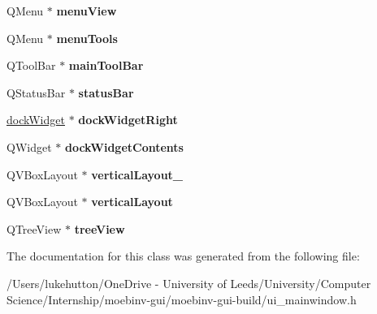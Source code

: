 \begin{DoxyCompactItemize}
Q\+Menu $\ast$ {\bfseries menu\+View}
\item 
\mbox{\label{class_ui___main_window_a552c7b6d729252c2768c9a077679fef7}} 
Q\+Menu $\ast$ {\bfseries menu\+Tools}
\item 
\mbox{\label{class_ui___main_window_a5172877001c8c7b4e0f6de50421867d1}} 
Q\+Tool\+Bar $\ast$ {\bfseries main\+Tool\+Bar}
\item 
\mbox{\label{class_ui___main_window_a50fa481337604bcc8bf68de18ab16ecd}} 
Q\+Status\+Bar $\ast$ {\bfseries status\+Bar}
\item 
\mbox{\label{class_ui___main_window_a0b290047e65bbb51d10c15a73b264d84}} 
\mbox{\hyperlink{classdock_widget}{dock\+Widget}} $\ast$ {\bfseries dock\+Widget\+Right}
\item 
\mbox{\label{class_ui___main_window_a765ded8236736213d556f6f91941808e}} 
Q\+Widget $\ast$ {\bfseries dock\+Widget\+Contents}
\item 
\mbox{\label{class_ui___main_window_a0c01bad60d9f422a1258e710635a2f65}} 
Q\+V\+Box\+Layout $\ast$ {\bfseries vertical\+Layout\+\_}
\item 
\mbox{\label{class_ui___main_window_aecd96a04789fcfec3f98d80390ad8184}} 
Q\+V\+Box\+Layout $\ast$ {\bfseries vertical\+Layout}
\item 
\mbox{\label{class_ui___main_window_a2e917678fb1e644071b85bf38d97125e}} 
Q\+Tree\+View $\ast$ {\bfseries tree\+View}
\end{DoxyCompactItemize}


The documentation for this class was generated from the following file\+:\begin{DoxyCompactItemize}
\item 
/\+Users/lukehutton/\+One\+Drive -\/ University of Leeds/\+University/\+Computer Science/\+Internship/moebinv-\/gui/moebinv-\/gui-\/build/ui\+\_\+mainwindow.\+h\end{DoxyCompactItemize}
